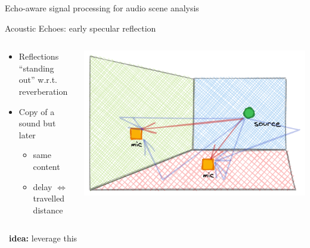 \begin{frame}[t]{\alert{Echo-aware} signal processing for audio scene analysis}
    \pause
    \begin{mydefblock}{Acoustic Echoes: early specular reflection}

        \vspace{-2mm}
        \begin{columns}[onlytextwidth]
            \begin{column}{0.58\textwidth}
                \begin{itemize}
                    \item Reflections ``standing out'' w.r.t. reverberation
                    \item Copy of a sound but later
                    \begin{itemize}
                        \item same content
                        \item delay $\Leftrightarrow$ travelled distance
                    \end{itemize}
                \end{itemize}
            \end{column}
            \begin{column}{0.40\textwidth}
                \centering
                \includegraphics[width=\textwidth]{figures/echoes}
            \end{column}

        \end{columns}
    \end{mydefblock}

    \pause
    \begin{center}
        \faExclamation~\textbf{idea:} leverage this
    \end{center}
\end{frame}

